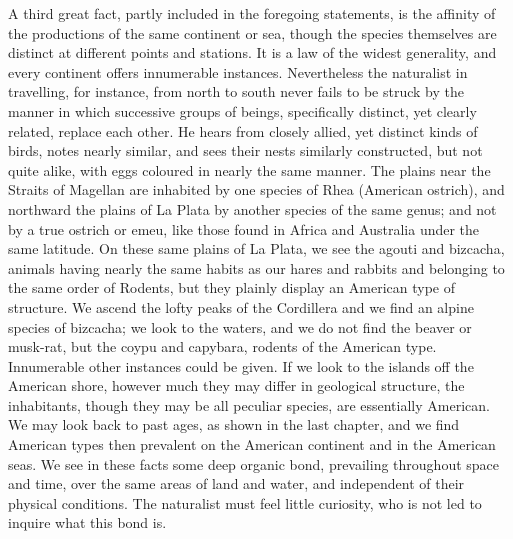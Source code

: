 \indent A third great fact, partly included in the foregoing statements, is the affinity of the productions of the same continent or sea, though the species themselves are distinct at different points and stations. It is a law of the widest generality, and every continent offers innumerable instances. Nevertheless the naturalist in travelling, for instance, from north to south never fails to be struck by the manner in which successive groups of beings, specifically distinct, yet clearly related, replace each other. He hears from closely allied, yet distinct kinds of birds, notes nearly similar, and sees their nests similarly constructed, but not quite alike, with eggs coloured in nearly the same manner. The plains near the Straits of Magellan are inhabited by one species of Rhea (American ostrich), and northward the plains of La Plata by another species of the same genus; and not by a true ostrich or emeu, like those found in Africa and Australia under the same latitude. On these same plains of La Plata, we see the agouti and bizcacha, animals having nearly the same habits as our hares and rabbits and belonging to the same order of Rodents, but they plainly display an American type of structure.  We ascend the lofty peaks of the Cordillera and we find an alpine species of bizcacha; we look to the waters, and we do not find the beaver or musk-rat, but the coypu and capybara, rodents of the American type.  Innumerable other instances could be given. If we look to the islands off the American shore, however much they may differ in geological structure, the inhabitants, though they may be all peculiar species, are essentially American. We may look back to past ages, as shown in the last chapter, and we find American types then prevalent on the American continent and in the American seas. We see in these facts some deep organic bond, prevailing throughout space and time, over the same areas of land and water, and independent of their physical conditions. The naturalist must feel little curiosity, who is not led to inquire what this bond is.~\\
